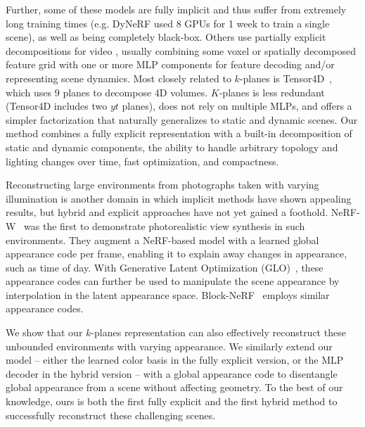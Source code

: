 \documentclass[10pt,twocolumn,letterpaper]{article}
\makeatletter
\newcommand{\modelname}{$k$-planes}
\newcommand{\Modelname}{$K$-planes}
\renewcommand{\paragraph}{\@startsection{paragraph}{4}{\z@}{0.65ex \@plus 1ex \@minus .2ex}{-1em}{\normalfont \normalsize \bfseries }}
\makeatother
\begin{document}
Further, some of these models are fully implicit \cite{dnerf, dynerf} and thus suffer from extremely long training times (e.g. DyNeRF used 8 GPUs for 1 week to train a single scene), as well as being completely black-box. Others use partially explicit decompositions for video \cite{tineuvox, nvgd, mixvoxels, v4d, tensor4d, devrf, neuralvolumes, nerfplayer}, usually combining some voxel or spatially decomposed feature grid with one or more MLP components for feature decoding and/or representing scene dynamics. Most closely related to \modelname{} is Tensor4D~\cite{tensor4d}, which uses 9 planes to decompose 4D volumes. \Modelname{} is less redundant (\eg Tensor4D includes two $yt$ planes), does not rely on multiple MLPs, and offers a simpler factorization that naturally generalizes to static and dynamic scenes.
Our method combines a fully explicit representation with a built-in decomposition of static and dynamic components, the ability to handle arbitrary topology and lighting changes over time, fast optimization, and compactness.





\paragraph{Appearance embedding.}
Reconstructing large environments from photographs taken with varying illumination is another domain in which implicit methods have shown appealing results, but hybrid and explicit approaches have not yet gained a foothold. NeRF-W~\cite{martinbrualla2020nerfw} was the first to demonstrate photorealistic view synthesis in such environments. They augment a NeRF-based model with a learned global appearance code per frame, enabling it to explain away changes in appearance, such as time of day. With Generative Latent Optimization (GLO)~\cite{Piotr2017latentspaceoptim}, these appearance codes can further be used to manipulate the scene appearance by interpolation in the latent appearance space. Block-NeRF~\cite{blocknerf2022tancik} employs similar appearance codes.


We show that our \modelname{} representation can also effectively reconstruct these unbounded environments with varying appearance.
We similarly extend our model -- either the learned color basis in the fully explicit version, or the MLP decoder in the hybrid version -- with a global appearance code to disentangle global appearance from a scene without affecting geometry. To the best of our knowledge, ours is both the first fully explicit and the first hybrid method to successfully reconstruct these challenging scenes.
\end{document}
